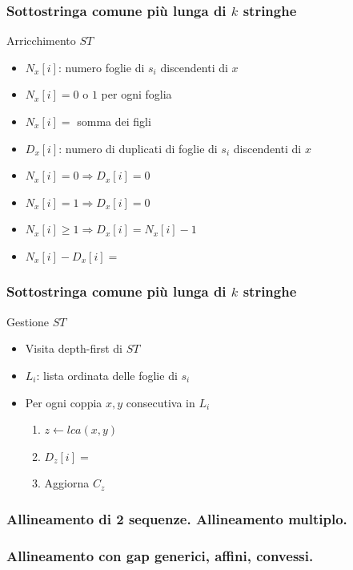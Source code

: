 \begin{frame}[fragile]
\frametitle{Sottostringa comune più lunga di $k$ stringhe}
\begin{block}{Arricchimento $ST$}
\begin{itemize}
\item
$N_{x}[i]$: numero foglie di $s_{i}$ discendenti di $x$
\item
$N_{x}[i]=0$ o $1$ per ogni foglia
\item
$N_{x}[i]=$ somma dei figli
\item
$D_{x}[i]$: numero di duplicati di foglie di $s_{i}$ discendenti di $x$
\item
$N_{x}[i]=0 \Rightarrow D_{x}[i]=0$
\item
$N_{x}[i]=1 \Rightarrow D_{x}[i]=0$
\item
$N_{x}[i]\ge 1 \Rightarrow D_{x}[i]=N_{x}[i]-1$
\item
$N_{x}[i] - D_{x}[i] =$ 
\end{itemize}
\end{block}
\end{frame}

\begin{frame}[fragile]
\frametitle{Sottostringa comune più lunga di $k$ stringhe}
\begin{block}{Gestione $ST$}
\begin{itemize}
\item
Visita depth-first di $ST$
\item
$L_{i}$: lista ordinata delle foglie di $s_{i}$
\item
Per ogni coppia $x,y$ consecutiva in $L_{i}$
\begin{enumerate}
\item
$z\gets lca(x,y)$
\item
$D_{z}[i]=$
\item
Aggiorna $C_{z}$
\end{enumerate}
\end{itemize}
\end{block}
\end{frame}

\begin{frame}[fragile]
\frametitle{Allineamento di 2 sequenze. Allineamento multiplo.}
\end{frame}

\begin{frame}[fragile]
\frametitle{Allineamento con gap generici, affini, convessi.}
\end{frame}

